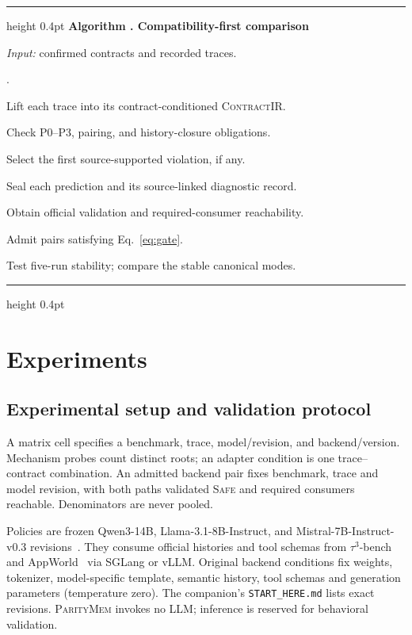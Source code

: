\documentclass[letterpaper]{article}
\newcommand{\system}{\textsc{ParityMem}\xspace}
\newcommand{\contractir}{\textsc{ContractIR}\xspace}
\newcounter{auditprocedure}
\begin{document}
\begin{center}
\begin{minipage}{\linewidth}
\label{alg:comparison}
\hrule height 0.4pt\vspace{3pt}
\noindent\textbf{Algorithm \theauditprocedure. Compatibility-first comparison}\par
\noindent\textit{Input:} confirmed contracts and recorded traces.\par
\begin{list}{.}{%
\setlength{\leftmargin}{1.4em}\setlength{\labelsep}{0.4em}%
\setlength{\topsep}{1pt}\setlength{\itemsep}{0pt}%
\setlength{\parsep}{0pt}\setlength{\partopsep}{0pt}}
\item Lift each trace into its contract-conditioned \contractir.
\item Check P0--P3, pairing, and history-closure obligations.
\item Select the first source-supported violation, if any.
\item Seal each prediction and its source-linked diagnostic record.
\item Obtain official validation and required-consumer reachability.
\item Admit pairs satisfying Eq.~\eqref{eq:gate}.
\item Test five-run stability; compare the stable canonical modes.
\end{list}
\vspace{2pt}\hrule height 0.4pt
\end{minipage}
\end{center}

\section{Experiments}

\subsection{Experimental setup and validation protocol}
A matrix cell specifies a benchmark, trace, model/revision, and backend/version.
Mechanism probes count distinct roots; an adapter condition is one
trace--contract combination. An admitted backend pair fixes benchmark,
trace and model revision, with both paths validated \textsc{Safe} and required
consumers reachable. Denominators are never pooled.

Policies are frozen Qwen3-14B, Llama-3.1-8B-Instruct, and
Mistral-7B-Instruct-v0.3 revisions~\cite{yang2025qwen3,grattafiori2024llama3,jiang2023mistral7b}.
They consume official histories and tool schemas from $\tau^3$-bench and
AppWorld~\cite{tau3bench2026,yao2024tau,trivedi2024appworld} via SGLang or vLLM.
Original backend conditions fix weights, tokenizer, model-specific template,
semantic history, tool schemas and generation parameters (temperature zero).
The companion's \texttt{START\_HERE.md} lists exact revisions. \system invokes
no LLM; inference is reserved for behavioral validation.
\end{document}
